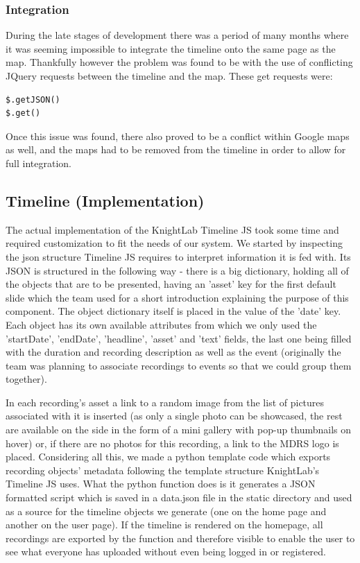 \documentclass{l3proj}
\begin{document}
\subsubsection{Integration}

During the late stages of development there was a period of many months where it was seeming impossible to integrate the timeline onto the same page as the map. Thankfully however the problem was found to be with the use of conflicting JQuery requests between the timeline and the map. These get requests were:
\begin{verbatim}
$.getJSON()
$.get()
\end{verbatim}
Once this issue was found, there also proved to be a conflict within Google maps as well, and the maps had to be removed from the timeline in order to allow for full integration.

\subsection{Timeline (Implementation)}

The actual implementation of the KnightLab Timeline JS took some time and required customization to fit the needs of our system. We started by inspecting the json structure Timeline JS requires to interpret information it is fed with.
Its JSON is structured in the following way - there is a big dictionary, holding all of the objects that are to be presented, having an 'asset' key for the first default slide which the team used for a short introduction explaining the purpose of this component.
The object dictionary itself is placed in the value of the 'date' key. Each object has its own available attributes from which we only used the 'startDate', 'endDate', 'headline', 'asset' and 'text' fields, the last one being filled with the duration and recording description as well as the event (originally the team was planning to associate recordings to events so that we could group them together).

In each recording's asset a link to a random image from the list of pictures associated with it is inserted (as only a single photo can be showcased, the rest are available on the side in the form of a mini gallery with pop-up thumbnails on hover) or, if there are no photos for this recording, a link to the MDRS logo is placed. Considering all this, we made a python template code which exports recording objects' metadata following the template structure KnightLab's Timeline JS uses. What the python function does is it generates a JSON formatted script which is saved in a data.json file in the static directory and used as a source for the timeline objects we generate (one on the home page and another on the user page). If the timeline is rendered on the homepage, all recordings are exported by the function and therefore visible to enable the user to see what everyone has uploaded without even being logged in or registered.
\end{document}
